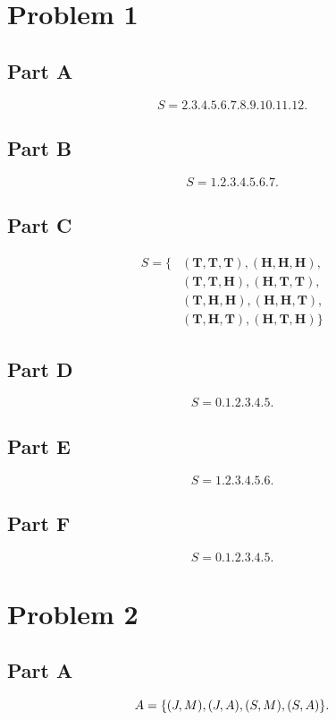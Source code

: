 \documentclass[12pt]{extarticle}
\begin{document}
\section*{Problem 1}
\begin{multicols}{2}
\subsection*{Part A}
\[
	S = \qty{2,3,4,5,6,7,8,9,10,11,12}
.\]
\subsection*{Part B}
\[
	S = \qty{1,2,3,4,5,6,7}
.\]

\subsection*{Part C}
	\def\Heads{\mathbf{H}}
	\def\Tails{\mathbf{T}}
	\begin{align*}
		S = \{
			&(\Tails,\Tails,\Tails), (\Heads,\Heads,\Heads),\\
			&(\Tails,\Tails,\Heads), (\Heads,\Tails,\Tails),\\
			&(\Tails,\Heads,\Heads), (\Heads,\Heads,\Tails), \\
			&(\Tails,\Heads,\Tails), (\Heads,\Tails,\Heads)
		\}
	\end{align*}

\columnbreak

\subsection*{Part D}
\[
	S = \qty{0,1,2,3,4,5}
.\]

\subsection*{Part E}
\[
	S = \qty{1,2,3,4,5,6}
.\]

\subsection*{Part F}
\[
	S = \qty{0,1,2,3,4,5}
.\]
\end{multicols}

\section*{Problem 2}
\subsection*{Part A}
\[
	A = \qty{
		(J,M),
		(J,A),
		(S,M),
		(S,A)
	}
.\]
\end{document}
